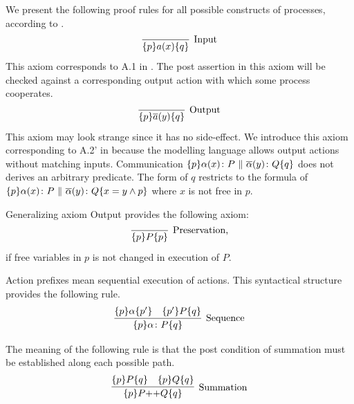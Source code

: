 \documentclass[12pt,a4paper,titlepage]{article}
\theoremstyle{break}
\begin{document}
We present the following proof rules for all possible constructs of processes, according to \cite{Apt:1980}.
  \begin{displaymath}
\infer[\mbox{Input}]{\{p\}a(x)\{q\}}
                    {}
  \end{displaymath}
This axiom corresponds to A.1 in \cite{Apt:1980}.
The post assertion in this axiom will be checked against a corresponding output action with which some process cooperates.
  \begin{displaymath}
\infer[\mbox{Output}]{\{p\}\bijection{a}(y)\{q\}}
                    {}
  \end{displaymath}
This axiom may look strange since it has no side-effect.
We introduce this axiom corresponding to A.2' in \cite{Apt:1980} because the modelling language allows output actions without matching inputs.
Communication \(\{p\}\alpha(x)\colon P\ \|\ \bijection{\alpha}(y)\colon Q\{q\}\) does not derives an arbitrary predicate.
The form of $q$ restricts to the formula of \(\{p\}\alpha(x)\colon P\ \|\ \bijection{\alpha}(y)\colon Q\{x=y\wedge p\}\) where $x$ is not free in $p$.

Generalizing axiom Output provides the following axiom:
  \begin{displaymath}
\infer[\mbox{Preservation,}]{\{p\}P\{p\}}
                    {}
  \end{displaymath}
if free variables in \(p\) is not changed in execution of \(P\).

Action prefixes mean sequential execution of actions.
This syntactical structure provides the following rule.
  \begin{displaymath}
\infer[\mbox{Sequence}]
      {\{p\}\alpha\colon P\{q\}}
      {\{p\}\alpha\{p'\}&\{p'\}P\{q\}}
  \end{displaymath}

The meaning of the following rule is that the post condition of summation must be established along each possible path.
  \begin{displaymath}
\infer[\mbox{Summation}]{\{p\}P\mbox{++}Q\{q\}}
                        {\{p\}P\{q\}&\{p\}Q\{q\}}
  \end{displaymath}
\end{document}

